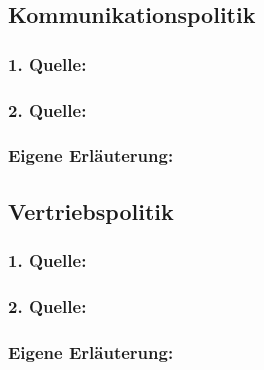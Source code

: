     \subsection{Kommunikationspolitik}
        \subsubsection*{1. Quelle:}
        \begin{abstract}
        \end{abstract}
        \subsubsection*{2. Quelle:}
        \begin{abstract}
        \end{abstract}
        \subsubsection*{Eigene Erläuterung:}
        \begin{abstract}
        \end{abstract}
    \subsection{Vertriebspolitik}
        \subsubsection*{1. Quelle:}
        \begin{abstract}
        \end{abstract}
        \subsubsection*{2. Quelle:}
        \begin{abstract}
        \end{abstract}
        \subsubsection*{Eigene Erläuterung:}
        \begin{abstract}
        \end{abstract}
